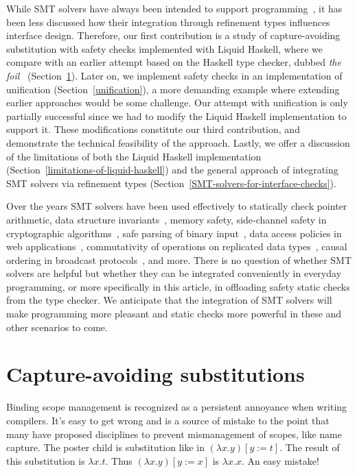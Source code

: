 \documentclass[sigconf, anonymous, review]{acmart}
\begin{document}
While SMT solvers have always been intended to support programming~\cite{barnett05, demoura08}, it has
been less discussed how their integration through refinement types influences
interface design. Therefore, our first contribution is a study of
capture-avoiding substitution with safety checks implemented with Liquid Haskell,
where we compare with an earlier attempt based on the Haskell type checker, dubbed
\textit{the foil}~\cite{maclaurin23}
(Section~\ref{capture-avoiding-substitution}). Later on, we implement safety checks
in an implementation of unification (Section~\ref{unification}), a more demanding
example where extending earlier approaches would be some challenge. Our
attempt with unification is only partially successful since we had to
modify the Liquid Haskell implementation to support it. These modifications
constitute our third contribution, and demonstrate the technical feasibility
of the approach. Lastly, we offer a discussion
of the limitations of both the Liquid Haskell implementation (Section~\ref{limitations-of-liquid-haskell}) and the
general approach of integrating SMT solvers via refinement
types (Section~\ref{SMT-solvers-for-interface-checks}).

Over the years SMT solvers have been used effectively to statically check pointer
arithmetic, data structure invariants~\cite{vazou14}, memory safety, side-channel
safety in cryptographic algorithms~\cite{zinzin17},
safe parsing of binary input~\cite{swamy22}, data access policies in web applications~\cite{lehmann21},
commutativity of operations on replicated data types~\cite{liu20}, causal ordering in
broadcast protocols~\cite{redmond23}, and more. There is no question of whether SMT solvers are
helpful but whether they can be integrated conveniently in everyday
programming, or more specifically in this article, in offloading safety static
checks from the type checker.
We anticipate that the integration of SMT solvers will make programming more
pleasant and static checks more powerful in these and other scenarios to come.


\section{Capture-avoiding substitutions}
\label{capture-avoiding-substitution}

Binding scope management is recognized as a persistent annoyance when writing compilers.
It's easy to get wrong and is a source of mistake to the point that many have
proposed disciplines to prevent mismanagement of scopes, like name capture.
The poster child is substitution like in
$(\lambda x. y)[y:=t]$. The result of this substitution is $\lambda x. t$.
Thus $(\lambda x. y)[y:=x]$ is $\lambda x. x$. An easy mistake!
\end{document}
